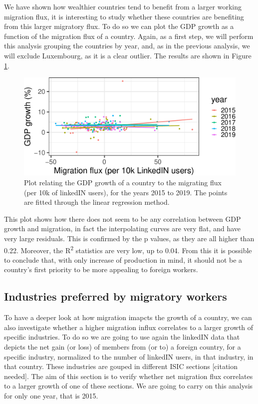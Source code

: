 \documentclass[
]{article}
\begin{document}
We have shown how wealthier countries tend to benefit from a larger
working migration flux, it is interesting to study whether these
countries are benefiting from this larger migratory flux. To do so we
can plot the GDP growth as a function of the migration flux of a
country. Again, as a first step, we will perform this analysis grouping
the countries by year, and, as in the previous analysis, we will exclude
Luxembourg, as it is a clear outlier. The results are shown in Figure
\ref{fig:growthVSmigration}.

\begin{figure}
\centering
\includegraphics{main_files/figure-latex/growthVSmigration-1.pdf}
\caption{Plot relating the GDP growth of a country to the migrating flux
(per 10k of linkedIN users), for the years 2015 to 2019. The points are
fitted through the linear regression method.
\label{fig:growthVSmigration}}
\end{figure}

This plot shows how there does not seem to be any correlation between
GDP growth and migration, in fact the interpolating curves are very
flat, and have very large residuals. This is confirmed by the p values,
as they are all higher than 0.22. Moreover, the R\textsuperscript{2}
statistics are very low, up to 0.04. From this it is possible to
conclude that, with only increase of production in mind, it should not
be a country's first priority to be more appealing to foreign workers.

\hypertarget{industries-preferred-by-migratory-workers}{%
\subsection{Industries preferred by migratory
workers}\label{industries-preferred-by-migratory-workers}}

To have a deeper look at how migration imapcts the growth of a country,
we can also investigate whether a higher migration influx correlates to
a larger growth of specific industries. To do so we are going to use
again the linkedIN data that depicts the net gain (or loss) of members
from (or to) a foreign country, for a specific industry, normalized to
the number of linkedIN users, in that industry, in that country. These
industries are gouped in different ISIC sections {[}citation needed{]}.
The aim of this section is to verify whether net migration flux
correlates to a larger growth of one of these sections. We are going to
carry on this analysis for only one year, that is 2015.
\end{document}
